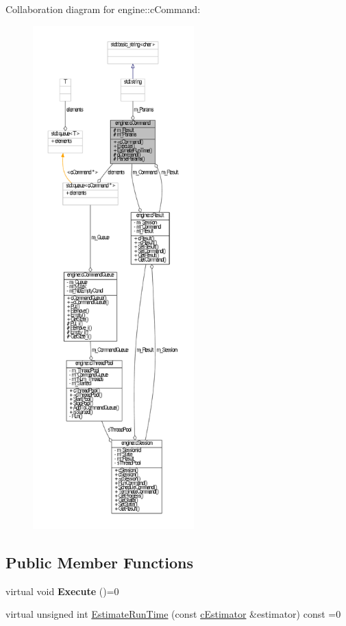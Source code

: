 \-Collaboration diagram for engine\-:\-:c\-Command\-:
\nopagebreak
\begin{figure}[H]
\begin{center}
\leavevmode
\includegraphics[height=550pt]{classengine_1_1cCommand__coll__graph}
\end{center}
\end{figure}
\subsection*{\-Public \-Member \-Functions}
\begin{DoxyCompactItemize}
\item 
\hypertarget{classengine_1_1cCommand_a4c84c161b94f6ae36aec3661f951b54f}{virtual void {\bfseries \-Execute} ()=0}\label{classengine_1_1cCommand_a4c84c161b94f6ae36aec3661f951b54f}

\item 
virtual unsigned int \hyperlink{classengine_1_1cCommand_a8b5b45ad34530c454722a44e41ce9e78}{\-Estimate\-Run\-Time} (const \hyperlink{classengine_1_1cEstimator}{c\-Estimator} \&estimator) const =0
\end{DoxyCompactItemize}
